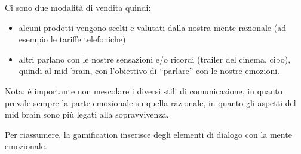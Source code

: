 Ci sono due modalità di vendita quindi:
\begin{itemize}
 \item alcuni prodotti vengono scelti e valutati dalla nostra mente razionale
(ad esempio le tariffe telefoniche)
 \item altri parlano con le nostre sensazioni e/o ricordi (trailer del cinema,
cibo), quindi al mid brain, con l'obiettivo di ``parlare'' con le nostre
emozioni.
\end{itemize}

Nota: è importante non mescolare i diversi stili di comunicazione, in quanto
prevale sempre la parte emozionale su quella razionale, in quanto gli aspetti
del mid brain sono più legati alla sopravvivenza.

Per riassumere, la gamification inserisce degli elementi di dialogo
con la mente emozionale.
